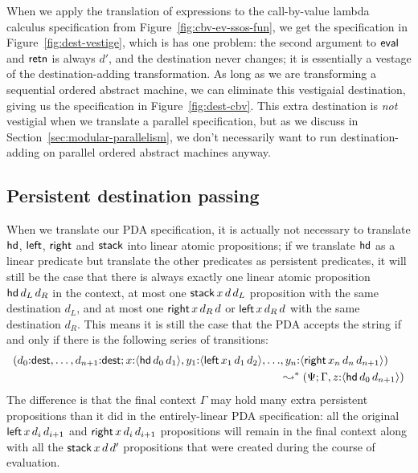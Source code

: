 When we apply the translation of expressions to the call-by-value
lambda calculus specification from Figure~\ref{fig:cbv-ev-ssos-fun},
we get the specification in Figure~\ref{fig:dest-vestige}, which is
has one problem: the second argument to ${\sf eval}$ and ${\sf retn}$
is always $d'$, and the destination never changes; it is essentially a
vestage of the destination-adding transformation. As long as we are
transforming a sequential ordered abstract machine, we can eliminate
this vestigaial destination, giving us the specification in
Figure~\ref{fig:dest-cbv}. This extra destination is {\it not}
vestigial when we translate a parallel specification, but as we
discuss in Section~\ref{sec:modular-parallelism}, we don't necessarily
want to run destination-adding on parallel ordered abstract machines
anyway.

\subsection{Persistent destination passing}

When we translate our PDA specification, it is actually not necessary
to translate ${\sf hd}$, ${\sf left}$, ${\sf right}$ and ${\sf stack}$ into
linear atomic propositions; if we translate ${\sf hd}$ as
a linear predicate but translate the other predicates as persistent
predicates, it will still be the case that there is always exactly one
linear atomic proposition ${\sf hd}\,d_L\,d_R$ in the context, at most one
${\sf stack}\,x\,d\,d_L$ proposition with the same destination $d_L$, 
and at most one ${\sf right}\,x\,d_R\,d$ or ${\sf left}\,x\,d_R\,d$ 
with the same destination $d_R$. This means it is still the case that the
PDA accepts the string if and only if there is the following series of 
transitions:
\begin{align*}
 (d_0{:}{\sf dest}, \ldots, d_{n+1}{:}{\sf dest}; 
    x{:}\langle {{\sf hd}\,d_0\,d_1} \rangle, 
    y_1{:}\langle {{\sf left}\,x_1\,d_1\,d_2} \rangle,
    \ldots&,
    y_n{:}\langle {{\sf right}\,x_n\,d_n\,d_{n+1}} \rangle)
\\
 & \leadsto^*
   (\Psi; \Gamma, z{:}\langle {{\sf hd}\,d_0\,d_{n+1}} \rangle)
\end{align*}
The difference is that the final context $\Gamma$ may hold many extra
persistent propositions than it did in the entirely-linear PDA
specification: all the original ${\sf left}\,x\,d_i\,d_{i+1}$ and
${\sf right}\,x\,d_i\,d_{i+1}$ propositions will remain in the final context
along with all the ${\sf stack}\,x\,d\,d'$ propositions that were created
during the course of evaluation.

